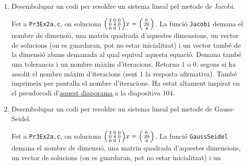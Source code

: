 \documentclass[a4paper, 12pt]{article}
\begin{document}
    \begin{exercici}
        \begin{enumerate}[label=\alph*)]
            \item Desembolupar un codi per resoldre un sistema lineal pel metode de Jacobi.\\
            \begin{solucio}
                Fet a \verb|Pr3Ex2a.c|, on soluciona $\begin{psmallmatrix}2&0&0\\0&4&0\\0&0&1\end{psmallmatrix}x = \begin{psmallmatrix}6\\20\\4\end{psmallmatrix}$.
                La funció \verb|Jacobi| demana el nombre de dimensió, una matriu quadrada d'aquestes
                dimensions, un vector de solucions (on es guardaran, pot no estar inicialitzat) i un
                vector també de la dimensió abans demanada al qual equival aquesta equació. Demana
                també una tolerancia i un nombre màxim d'iteracions. Retorna $1$ o $0$, segons si
                ha assolit el nombre máxim d'iteracions (sent $1$ la resposta afirmativa). També
                imprimeix per pantalla el nombre d'iteracions. Ha estat altament inspirat en el
                pseudocodi d'\href{https://e-aules.uab.cat/2023-24/pluginfile.php/705245/mod_resource/content/1/CalcNumMathCAD-LinAlg.pdf}{aquest diaporama} 
                a la diapositiva 104.
            \end{solucio}
            \item Desembolupar un codi per resoldre un sistema lineal pel metode de Gauss-Seidel.\\
            \begin{solucio}
                Fet a \verb|Pr3Ex2a.c|, on soluciona $\begin{psmallmatrix}2&0&0\\0&4&0\\0&0&1\end{psmallmatrix}x = \begin{psmallmatrix}6\\20\\4\end{psmallmatrix}$.
                La funció \verb|GaussSeidel| demana el nombre de dimensió, una matriu quadrada d'aquestes
                dimensions, un vector de solucions (on es guardaran, pot no estar inicialitzat) i un

\end{solucio}
\end{enumerate}
\end{exercici}
\end{document}
